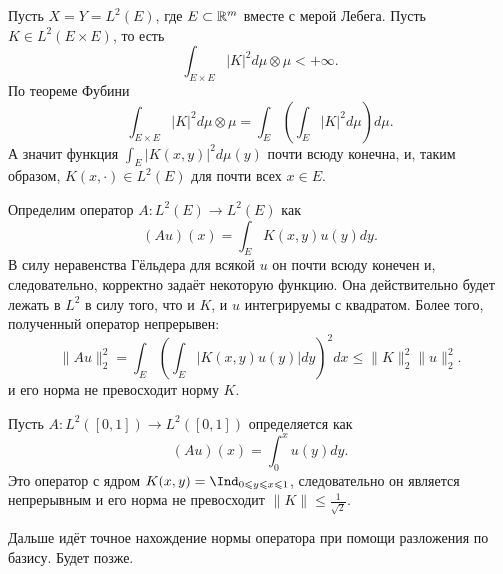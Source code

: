 \begin{example}
    Пусть $X = Y = L^2(E)$, где $E \subset\mathbb{R}^m$ вместе с мерой Лебега.
    Пусть $K \in L^2(E \times E)$, то есть
    \[
        \int_{E \times E} |K|^2 d\mu \otimes \mu < +\infty.
    \]
    По теореме Фубини
    \[
        \int_{E \times E} |K|^2 d\mu \otimes \mu = \int_{E} \left(\int_{E} |K|^2 d\mu \right)d\mu.
    \]
    А значит функция $\int_{E} |K(x, y)|^2 d\mu(y)$ почти всюду конечна, и, таким образом, $K(x, \cdot) \in L^2(E)$ для почти всех $x \in E$.

    Определим оператор $A\colon L^2(E) \to L^2(E)$ как
    \[
        (Au)(x) = \int_{E} K(x, y) u(y) dy.
    \]
    В силу неравенства Гёльдера для всякой $u$ он почти всюду конечен и, следовательно, корректно задаёт некоторую функцию.
    Она действительно будет лежать в $L^2$ в силу того, что и $K$, и $u$ интегрируемы с квадратом.
    Более того, полученный оператор непрерывен:
    \[
        \|Au\|^2_2 = \int_{E} \left(\int_{E}|K(x, y) u(y)|dy\right)^2 dx \leq \|K\|^2_2 \|u\|_2^2.
    \]
    и его норма не превосходит норму $K$.
\end{example}
\begin{example}
    Пусть $A\colon L^2([0, 1]) \to L^2([0, 1])$ определяется как
    \[
        (Au)(x) = \int_0^{x} u(y)dy.
    \]
    Это оператор с ядром $K(x, y) = \Ind_{0 \leq y \leq x \leq 1}$, следовательно он является непрерывным и его норма не превосходит $\|K\| \leq \frac{1}{\sqrt{2}}$.

    \begin{notet}
        Дальше идёт точное нахождение нормы оператора при помощи разложения по базису.
        Будет позже.
    \end{notet}
\end{example}

